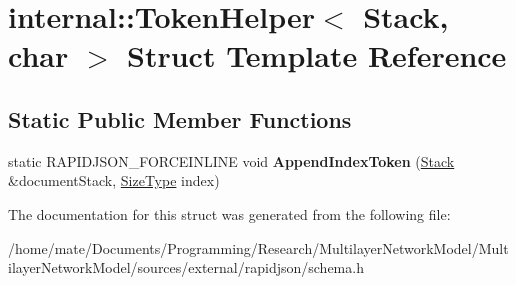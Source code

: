 \hypertarget{structinternal_1_1TokenHelper_3_01Stack_00_01char_01_4}{}\section{internal\+:\+:Token\+Helper$<$ Stack, char $>$ Struct Template Reference}
\label{structinternal_1_1TokenHelper_3_01Stack_00_01char_01_4}
\subsection*{Static Public Member Functions}
\begin{DoxyCompactItemize}
\item 
static R\+A\+P\+I\+D\+J\+S\+O\+N\+\_\+\+F\+O\+R\+C\+E\+I\+N\+L\+I\+NE void {\bfseries Append\+Index\+Token} (\hyperlink{classinternal_1_1Stack}{Stack} \&document\+Stack, \hyperlink{rapidjson_8h_a5ed6e6e67250fadbd041127e6386dcb5}{Size\+Type} index)\hypertarget{structinternal_1_1TokenHelper_3_01Stack_00_01char_01_4_a5d635eb7590e098c3340c9e5dcc72ae3}{}\label{structinternal_1_1TokenHelper_3_01Stack_00_01char_01_4_a5d635eb7590e098c3340c9e5dcc72ae3}

\end{DoxyCompactItemize}


The documentation for this struct was generated from the following file\+:\begin{DoxyCompactItemize}
\item 
/home/mate/\+Documents/\+Programming/\+Research/\+Multilayer\+Network\+Model/\+Multilayer\+Network\+Model/sources/external/rapidjson/schema.\+h\end{DoxyCompactItemize}
